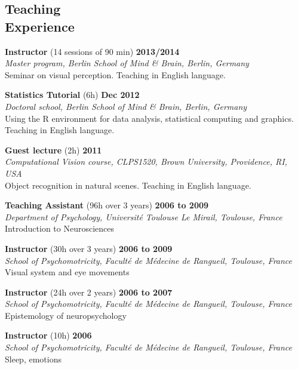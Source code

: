 \documentclass[margin,line]{resume}
\begin{document}
\begin{resume}
	\vspace{3mm}
    \section{\mysidestyle Teaching\\Experience}
    
   	 \textbf{Instructor} (14 sessions of 90 min) \hfill \textbf{2013/2014}\\
	\textsl{Master program, Berlin School of Mind \& Brain, Berlin, Germany}\\
	Seminar on visual perception. Teaching in English language.
	
    	\textbf{Statistics Tutorial} (6h) \hfill \textbf{Dec 2012}\\
	\textsl{Doctoral school, Berlin School of Mind \& Brain, Berlin, Germany}\\
	Using the R environment for data analysis, statistical computing and graphics. Teaching in English language.

	\textbf{Guest lecture} (2h) \hfill \textbf{2011}\\
	\textsl{Computational Vision course, CLPS1520, Brown University, Providence, RI, USA}\\
	Object recognition in natural scenes. Teaching in English language.

	\textbf{Teaching Assistant} (96h over 3 years) \hfill \textbf{2006 to 2009}\\
	\textsl{Department of Psychology, Université Toulouse Le Mirail, Toulouse, France}\\
	Introduction to Neurosciences

	\textbf{Instructor} (30h over 3 years) \hfill \textbf{2006 to 2009}\\
	\textsl{School of Psychomotricity, Faculté de Médecine de Rangueil, Toulouse, France}\\
	Visual system and eye movements

	\textbf{Instructor} (24h over 2 years) \hfill \textbf{2006 to 2007}\\
	\textsl{School of Psychomotricity, Faculté de Médecine de Rangueil, Toulouse, France}\\
	Epistemology of neuropsychology

	\textbf{Instructor} (10h) \hfill \textbf{2006}\\
	\textsl{School of Psychomotricity, Faculté de Médecine de Rangueil, Toulouse, France}\\
	Sleep, emotions



\end{resume}
\end{document}
